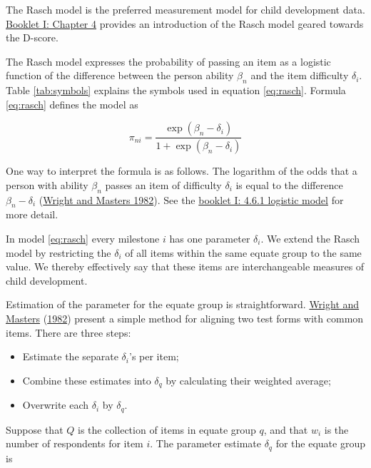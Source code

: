 \documentclass[
]{book}
\providecommand{\tightlist}{%
  \setlength{\itemsep}{0pt}\setlength{\parskip}{0pt}}
\begin{document}
The Rasch model is the preferred measurement model for child development data. \href{https://d-score.org/dbook1/ch-newmodel.html}{Booklet I: Chapter 4} provides an introduction of the Rasch model geared towards the D-score.

The Rasch model expresses the probability of passing an item as a logistic function of the difference between the person ability \(\beta_n\) and the item difficulty \(\delta_i\). Table \ref{tab:symbols} explains the symbols used in equation \eqref{eq:rasch}. Formula \eqref{eq:rasch} defines the model as

\begin{equation}
\pi_{ni} = \frac{\exp(\beta_n - \delta_i)}{1+\exp(\beta_n -\delta_i)} \label{eq:rasch}
\end{equation}

One way to interpret the formula is as follows. The logarithm of the odds that a person with ability \(\beta_n\) passes an item of difficulty \(\delta_i\) is equal to the difference \(\beta_n-\delta_i\) (\protect\hyperlink{ref-wright1982}{Wright and Masters 1982}). See the \href{https://d-score.org/dbook1/sec-itemresponsefunctions.html\#logistic-model}{booklet I: 4.6.1 logistic model} for more detail.

In model \eqref{eq:rasch} every milestone \(i\) has one parameter \(\delta_i\). We extend the Rasch model by restricting the \(\delta_i\) of all items within the same equate group to the same value. We thereby effectively say that these items are interchangeable measures of child development.

Estimation of the parameter for the equate group is straightforward. \protect\hyperlink{ref-wright1982}{Wright and Masters} (\protect\hyperlink{ref-wright1982}{1982}) present a simple method for aligning two test forms with common items. There are three steps:

\begin{itemize}
\tightlist
\item
  Estimate the separate \(\delta_i\)'s per item;
\item
  Combine these estimates into \(\delta_q\) by calculating their weighted average;
\item
  Overwrite each \(\delta_i\) by \(\delta_q\).
\end{itemize}

Suppose that \(Q\) is the collection of items in equate group \(q\), and that \(w_i\) is the number of respondents for item \(i\). The parameter estimate \(\delta_q\) for the equate group is
\end{document}
